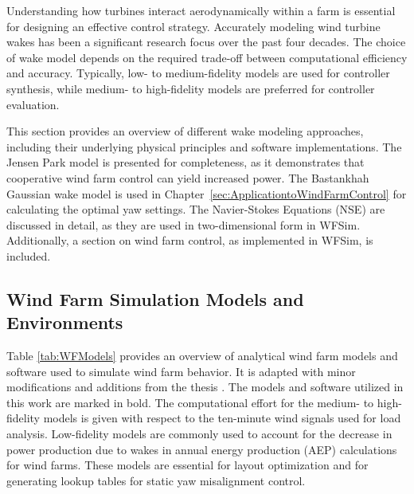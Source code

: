 Understanding how turbines interact aerodynamically within a farm is essential for designing an effective control strategy. Accurately modeling wind turbine wakes has been a significant research focus over the past four decades. The choice of wake model depends on the required trade-off between computational efficiency and accuracy. Typically, low- to medium-fidelity models are used for controller synthesis, while medium- to high-fidelity models are preferred for controller evaluation.

This section provides an overview of different wake modeling approaches, including their underlying physical principles and software implementations. The Jensen Park model \cite{jensen1983note} is presented for completeness, as it demonstrates that cooperative wind farm control can yield increased power. The Bastankhah Gaussian wake model \cite{bastankhah2016experimental} is used in Chapter~\ref{sec:ApplicationtoWindFarmControl} for calculating the optimal yaw settings. The Navier-Stokes Equations (NSE) are discussed in detail, as they are used in two-dimensional form in WFSim. Additionally, a section on wind farm control, as implemented in WFSim, is included.


\subsection{Wind Farm Simulation Models and Environments}\label{Subsection:WindFarmSimulationModels}

Table \ref{tab:WFModels} provides an overview of analytical wind farm models and software used to simulate wind farm behavior. It is adapted with minor modifications and additions from the thesis \cite{smits2023fast}. The models and software utilized in this work are marked in bold. The computational effort for the medium- to high-fidelity models is given with respect to the ten-minute wind signals used for load analysis. Low-fidelity models are commonly used to account for the decrease in power production due to wakes in annual energy production (AEP) calculations for wind farms. These models are essential for layout optimization and for generating lookup tables for static yaw misalignment control. 

